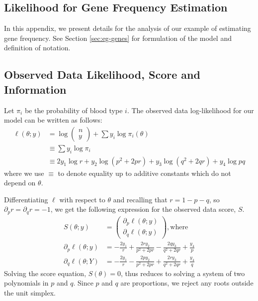 \documentclass[11pt, oneside]{article}   	%
\begin{document}
\begin{appendices}

    \section{Likelihood for Gene Frequency Estimation}
    \label{app:blood}

    In this appendix, we present details for the analysis of our example of estimating gene frequency. See Section \ref{sec:eg-genes} for formulation of the model and definition of notation.

    \subsection{Observed Data Likelihood, Score and Information}
    \label{app:blood_obs}

    Let $\pi_i$ be the probability of blood type $i$. The observed data log-likelihood for our model can be written as follows:
    \begin{align}
        \ell(\theta; y) &= \log \begin{pmatrix} n \\ y \end{pmatrix} + \sum y_i \log \pi_i(\theta)\\
        & \equiv \sum y_i \log \pi_i\\
        &\equiv 2 y_1 \log r + y_2 \log(p^2 + 2pr) + y_3 \log(q^2 + 2qr) + y_4 \log pq
    \end{align}
    where we use $\equiv$ to denote equality up to additive constants which do not depend on $\theta$.

    Differentiating $\ell$ with respect to $\theta$ and recalling that $r = 1 - p - q$, so $\partial_p r = \partial_q r = -1$, we get the following expression for the observed data score, $S$.
    \begin{align}
        S(\theta; y) &= \begin{pmatrix}
            \partial_p \ell(\theta; y)\\
            \partial_q \ell(\theta; y) 
        \end{pmatrix} \mathrm{, where}\\
        \partial_p \ell(\theta; y) &= - \frac{2 y_1}{r}  + \frac{2r y_2}{p^2 + 2pr}  - \frac{2q y_3}{q^2 + 2qr}  + \frac{y_4}{p} \label{eq:gene_obs_score1}\\
        \partial_q \ell(\theta; Y) &= - \frac{2 y_1}{r}  - \frac{2p y_2}{p^2 + 2pr}  + \frac{2r y_3}{q^2 + 2qr}  + \frac{y_4}{q} \label{eq:gene_obs_score2}
    \end{align}
    Solving the score equation, $S(\theta) = 0$, thus reduces to solving a system of two polynomials in $p$ and $q$. Since $p$ and $q$ are proportions, we reject any roots outside the unit simplex.


\end{appendices}
\end{document}
